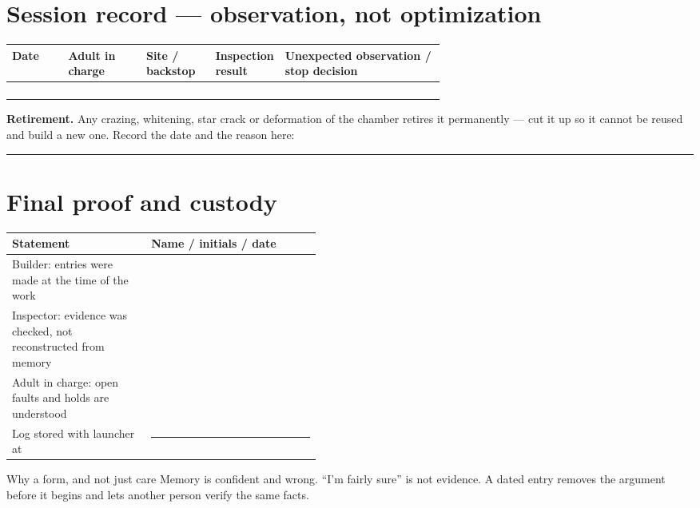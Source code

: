 \section{Session record --- observation, not optimization}
\begin{tabularx}{\linewidth}{@{}p{0.13\linewidth}p{0.18\linewidth}p{0.16\linewidth}p{0.16\linewidth}L@{}}
\toprule
\textbf{Date} & \textbf{Adult in charge} & \textbf{Site / backstop} &
\textbf{Inspection result} & \textbf{Unexpected observation / stop decision}\\
\midrule
& \rule{0pt}{1.3em} & & & \\\midrule
& \rule{0pt}{1.3em} & & & \\\midrule
& \rule{0pt}{1.3em} & & & \\\midrule
& \rule{0pt}{1.3em} & & & \\
\bottomrule
\end{tabularx}

\begin{telosframe}
\textbf{Retirement.} Any crazing, whitening, star crack or deformation of the
chamber retires it permanently --- cut it up so it cannot be reused and build a
new one. Record the date and the reason here:
\rule{0.5\linewidth}{0.4pt}
\end{telosframe}

\section{Final proof and custody}
\begin{tabularx}{\linewidth}{@{}p{0.45\linewidth}L@{}}
\toprule
\textbf{Statement} & \textbf{Name / initials / date}\\
\midrule
Builder: entries were made at the time of the work & \\[0.7em]
Inspector: evidence was checked, not reconstructed from memory & \\[0.7em]
Adult in charge: open faults and holds are understood & \\[0.7em]
Log stored with launcher at & \rule{0.60\linewidth}{0.4pt}\\
\bottomrule
\end{tabularx}

\begin{telospanel}{Why a form, and not just care}
Memory is confident and wrong. ``I'm fairly sure'' is not evidence. A dated
entry removes the argument before it begins and lets another person verify the
same facts.
\end{telospanel}

